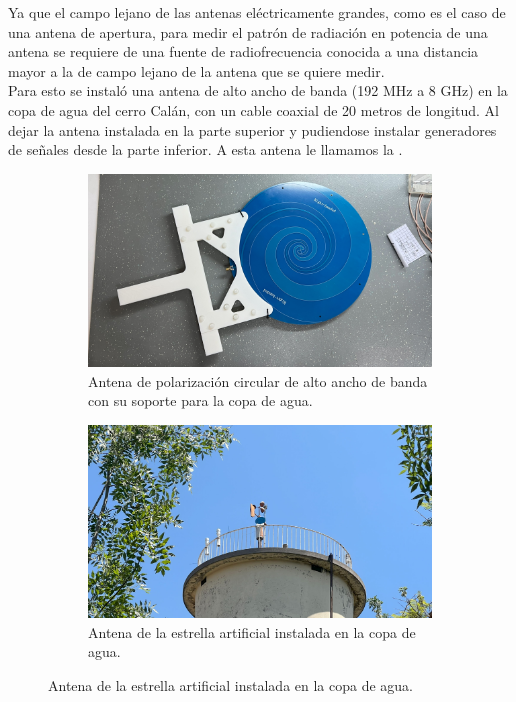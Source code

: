 Ya que el campo lejano de las antenas eléctricamente grandes, como es el caso de una antena de apertura, para medir el patrón de radiación en potencia de una antena se requiere de una fuente de radiofrecuencia conocida a una distancia mayor a la de campo lejano de la antena que se quiere medir.\\

Para esto se instaló una antena de alto ancho de banda (192 MHz a 8 GHz) en la copa de agua del cerro Calán, con un cable coaxial de 20 metros de longitud. Al dejar la antena instalada en la parte superior y pudiendose instalar generadores de señales desde la parte inferior. A esta antena le llamamos la .\\

\begin{figure}[h!]
    \centering
    \begin{subfigure}{0.45\textwidth}
        \includegraphics[width=\textwidth]{img/paleta}
        \caption{Antena de polarización circular de alto ancho de banda con su soporte para la copa de agua.}
        \label{fig:antena_estrella}
    \end{subfigure}
    \begin{subfigure}{0.45\textwidth}
        \includegraphics[width=\textwidth]{img/fake_star}
        \caption{Antena de la estrella artificial instalada en la copa de agua.}
        \label{fig:antena_estrella2}
    \end{subfigure}
\end{figure}

